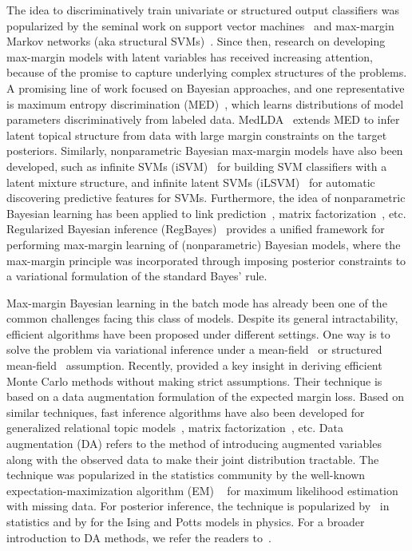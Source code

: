 \documentclass[twoside,11pt]{article}
\newcommand{\strin}[1]{\todo[size=\small, color=green!40]{\bf\sf  #1}}
\begin{document}
The idea to discriminatively train univariate or structured output classifiers was popularized by the seminal work on support vector machines~\citep{Vapnik:95} and max-margin Markov networks (aka structural SVMs)~\citep{koller2003max}. Since then, research on developing max-margin models with latent variables has received increasing attention, because of the promise to capture underlying complex structures of the problems. A promising line of work focused on Bayesian approaches, and one representative is maximum entropy discrimination (MED)~\citep{jaakkola1999maximum,jebara2001discriminative,Zhu:jmlr09}, which learns distributions of model parameters discriminatively from labeled data. MedLDA~\citep{zhu2012medlda} extends MED to infer latent topical structure from data with large margin constraints on the target posteriors. Similarly, nonparametric Bayesian max-margin models have also been developed, such as infinite SVMs (iSVM)~\citep{zhu2011infinite} for building SVM classifiers with a latent mixture structure, and infinite latent SVMs (iLSVM)~\citep{zhu2013bayesian} for automatic discovering predictive features for SVMs. Furthermore, the idea of nonparametric Bayesian learning has been applied to link prediction~\citep{zhu2012maxlink}, matrix factorization~\citep{xu2013fast}, etc. Regularized Bayesian inference (RegBayes)~\citep{zhu2013bayesian} provides a unified framework for performing max-margin learning of (nonparametric) Bayesian models, where the max-margin principle was incorporated through imposing posterior constraints to a variational formulation of the standard Bayes' rule.

Max-margin Bayesian learning in the batch mode has already been one of the common challenges facing this class of models. Despite its general intractability, efficient algorithms have been proposed under different settings. One way is to solve the problem via variational inference under a mean-field~\citep{zhu2012medlda} or structured mean-field~\citep{jiang2012monte} assumption. Recently, \cite{zhugibbs2013} provided a key insight in deriving efficient Monte Carlo methods without making strict assumptions. Their technique is based on a data augmentation formulation of the expected margin loss. Based on similar techniques, fast inference algorithms have also been developed for generalized relational topic models~\citep{chen2013generalized}, matrix factorization~\citep{xu2013fast}, etc. Data augmentation (DA) refers to the method of introducing augmented variables along with the observed data to make their joint distribution tractable. The technique was popularized in the statistics community by the well-known expectation-maximization algorithm (EM) ~\citep{dempster1977maximum} for maximum likelihood estimation with missing data. For posterior inference, the technique is popularized by~\cite{tanner1987calculation} in statistics and by \cite{swendsen1987nonuniversal} for the Ising and Potts models in physics. For a broader introduction to DA methods, we refer the readers to~\cite{van2001art}.
\end{document}
